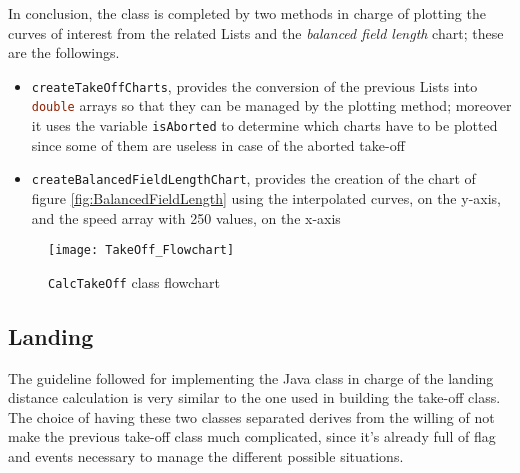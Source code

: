 \bigskip
\noindent
In conclusion, the class is completed by two methods in charge of plotting the curves of interest from the related \gls{List}s and the \emph{balanced field length} chart; these are the followings.
%
\begin{itemize}
\item \lstinline[language=Java]!createTakeOffCharts!, provides the conversion of the previous \gls{List}s into \lstinline[language=Java]!double! arrays so that they can be managed by the plotting method; moreover it uses the variable \lstinline[language=Java]!isAborted! to determine which charts have to be plotted since some of them are useless in case of the aborted take-off
\item \lstinline[language=Java]!createBalancedFieldLengthChart!, provides the creation of the chart of figure \ref{fig:BalancedFieldLength} using the interpolated curves, on the y-axis, and the speed array with 250 values, on the x-axis 
\end{itemize}
%
\begin{figure}[H]
\centering
\texttt{[image: TakeOff\_Flowchart]}
\caption{\lstinline[language=Java]!CalcTakeOff! class flowchart}
\label{fig:CalcTakeOffFlowchart}
\end{figure}
%
\subsection{Landing}
The guideline followed for implementing the Java class in charge of the landing distance calculation is very similar to the one used in building the take-off class. The choice of having these two classes separated derives from the willing of not make the previous take-off class much complicated, since it's already full of flag and events necessary to manage the different possible situations.


